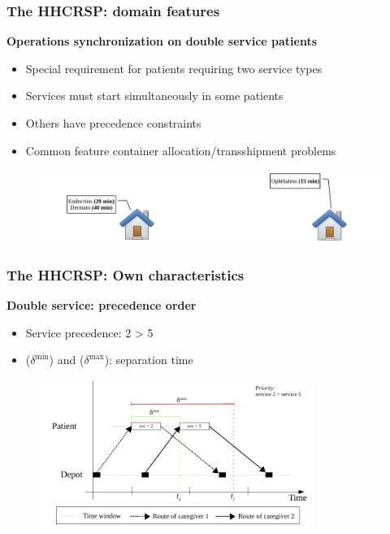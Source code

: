 \begin{frame}
   \frametitle{The HHCRSP: domain features}
   \textbf{Operations synchronization on double service patients}
   \begin{itemize}
      \item Special requirement for patients requiring two service types
      \item Services must start simultaneously in some patients
      \item Others have precedence constraints
      \item Common feature container allocation/transshipment problems \citep{drexl2012synchronization}
   \end{itemize}


   \begin{figure}[H]
      \includegraphics[width=1\textwidth,page=2]{fig/skilled}
   \end{figure}

\end{frame}

\begin{frame}
   \frametitle{The HHCRSP: Own characteristics}
   \textbf{Double service: precedence order}
   \begin{itemize}
      \item Service precedence: 2 > 5
      \item ($\delta^\mathrm{min}$) and ($\delta^\mathrm{max}$): separation time
   \end{itemize}

   \begin{figure}
      \centering
      \includegraphics[width=0.8\textwidth,page=1]{fig/sync-tsn2}
   \end{figure}
\end{frame}

